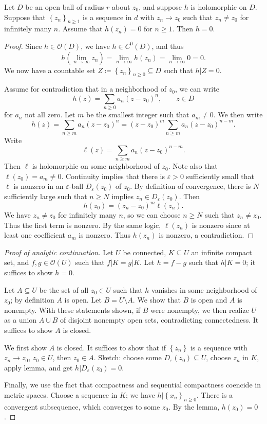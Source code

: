 \begin{lemma}\label{lma:k d}
	Let $D$ be an open ball of radius $r$ about $z_0$, and suppose $h$ is holomorphic on $D$. Suppose that $\left\{ z_n \right\}_{n\geq 1} $ is a sequence in $d$ with $z_n\to z_0$ such that $z_n \neq z_0$ for infinitely many $n$. Assume that $h(z_n)=0$ for $n\geq 1$. Then $h=0$.
\end{lemma}
\begin{proof}
	Since $h\in \mathcal{O} (D)$, we have $h\in C^0(D)$, and thus
	\[
		h\left( \lim_{n\to \infty } z_n \right) =\lim_{n\to \infty } h(z_n)=\lim_{n\to \infty } 0=0
	.\]
	We now have a countable set $Z\coloneqq \left\{ z_n \right\}_{n\geq 0} \subseteq D$ such that $h|Z=0$.

	Assume for contradiction that in a neighborhood of $z_0$, we can write
	\[
		h(z)=\sum_{n\geq 0} a_n(z-z_0)^n,\qquad z\in D
	\]
	for $a_n$ not all zero. Let $m$ be the smallest integer such that $a_m \neq 0$. We then write
	\[
		h(z) = \sum_{n\geq m} a_n(z-z_0)^{n} =(z-z_0)^m \sum_{n\geq m}a_{n} (z-z_0)^{n-m}
	.\]
	Write
	\[
		\ell (z)=\sum_{n\geq m} a_n(z-z_0)^{n-m} 
	.\]
	Then $\ell $ is holomorphic on some neighborhood of $z_0$. Note also that $\ell (z_0)=a_m\neq 0$. Continuity implies that there is $\varepsilon >0$ sufficiently small that $\ell $ is nonzero in an $\varepsilon $-ball $D_\varepsilon (z_0)$ of $z_0$. By definition of convergence, there is $N$ sufficiently large such that $n\geq N$ implies $z_n\in D_\varepsilon (z_0)$. Then
	\[
		h(z_0) = (z_n - z_0)^m \ell (z_n)
	.\]
	We have $z_n \neq z_0$ for infinitely many $n$, so we can choose $n\geq N$ such that $z_n \neq z_0$. Thus the first term is nonzero. By the same logic, $\ell (z_n)$ is nonzero since at least one coefficient $a_m$ is nonzero. Thus $h(z_n)$ is nonzero, a contradiction.
\end{proof}

\begin{proof}[Proof of analytic continuation]
	Let $U$ be connected, $K\subseteq U$ an infinite compact set, and $f,g\in \mathcal{O} (U)$ such that $f|K=g|K$. Let $h=f-g$ such that $h|K=0$; it suffices to show $h=0$.

	Let $A\subseteq U$ be the set of all $z_0\in U$ such that $h$ vanishes in some neighborhood of $z_0$; by definition $A$ is open. Let $B = U \setminus A$. We show that $B$ is open and $A$ is nonempty. With these statements shown, if $B$ were nonempty, we then realize $U$ as a union $A \cup B$ of disjoint nonempty open sets, contradicting connectedness. It suffices to show $A$ is closed.

	We first show $A$ is closed. It suffices to show that if $\left\{ z_n \right\}$ is a sequence with $z_n \to z_0$, $z_0\in U$, then $z_0\in A$. Sketch: choose some $D_\varepsilon (z_0)\subseteq U$, choose $z_n$ in $K$, apply lemma, and get $h|D_\varepsilon (z_0)=0$.

	Finally, we use the fact that compactness and sequential compactness coencide in metric spaces. Choose a sequence in $K$; we have $h|\left\{ x_n \right\}_{n\geq 0} $. There is a convergent subsequence, which converges to some $z_0$. By the lemma, $h(z_0)=0$. 
\end{proof}

